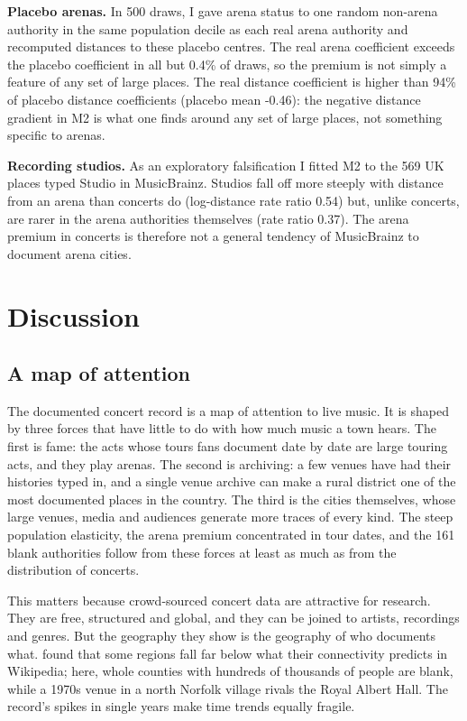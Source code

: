 \documentclass[11pt,a4paper]{article}
\begin{document}
\textbf{Placebo arenas.} In 500 draws, I gave arena status to one random non-arena authority in the same population decile as each real arena authority and recomputed distances to these placebo centres. The real arena coefficient exceeds the placebo coefficient in all but 0.4\% of draws, so the premium is not simply a feature of any set of large places. The real distance coefficient is higher than 94\% of placebo distance coefficients (placebo mean -0.46): the negative distance gradient in M2 is what one finds around any set of large places, not something specific to arenas.

\textbf{Recording studios.} As an exploratory falsification I fitted M2 to the 569 UK places typed Studio in MusicBrainz. Studios fall off more steeply with distance from an arena than concerts do (log-distance rate ratio 0.54) but, unlike concerts, are rarer in the arena authorities themselves (rate ratio 0.37). The arena premium in concerts is therefore not a general tendency of MusicBrainz to document arena cities.

\section{Discussion}\label{sec:disc}
\subsection{A map of attention}
The documented concert record is a map of attention to live music. It is shaped by three forces that have little to do with how much music a town hears. The first is fame: the acts whose tours fans document date by date are large touring acts, and they play arenas. The second is archiving: a few venues have had their histories typed in, and a single venue archive can make a rural district one of the most documented places in the country. The third is the cities themselves, whose large venues, media and audiences generate more traces of every kind. The steep population elasticity, the arena premium concentrated in tour dates, and the 161 blank authorities follow from these forces at least as much as from the distribution of concerts.

This matters because crowd-sourced concert data are attractive for research. They are free, structured and global, and they can be joined to artists, recordings and genres. But the geography they show is the geography of who documents what. \citet{graham2014} found that some regions fall far below what their connectivity predicts in Wikipedia; here, whole counties with hundreds of thousands of people are blank, while a 1970s venue in a north Norfolk village rivals the Royal Albert Hall. The record's spikes in single years make time trends equally fragile.
\end{document}
